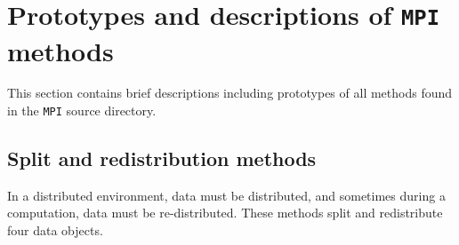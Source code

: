 \par
\section{Prototypes and descriptions of {\tt MPI} methods}
\label{section:MPI:proto}
\par
This section contains brief descriptions including prototypes
of all methods found in the {\tt MPI} source directory.
\par
\subsection{Split and redistribution methods}
\label{subsection:MPI:proto:split}
\par
In a distributed environment, data must be distributed,
and sometimes during a computation, data must be re-distributed.
These methods split and redistribute four data objects.
\par
